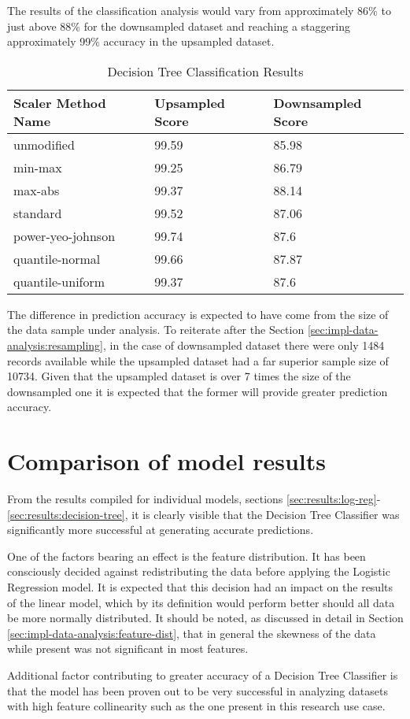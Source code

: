 The results of the classification analysis would vary from approximately 86\% to just above 88\% for the downsampled dataset and reaching a staggering approximately 99\% accuracy in the upsampled dataset.
\begin{table}[h!]
\centering
\caption{Decision Tree Classification Results}
\label{tbl:results:decision-tree}
\begin{tabular}{@{}lll@{}}
\toprule
Scaler Method Name & Upsampled Score & Downsampled Score \\ \midrule
unmodified & 99.59 & 85.98 \\
min-max & 99.25 & 86.79 \\
max-abs & 99.37 & 88.14 \\
standard & 99.52 & 87.06 \\
power-yeo-johnson & 99.74 & 87.6 \\
quantile-normal & 99.66 & 87.87 \\
quantile-uniform & 99.37 & 87.6 \\ \bottomrule
\end{tabular}
\end{table}

The difference in prediction accuracy is expected to have come from the size of the data sample under analysis. To reiterate after the Section \ref{sec:impl-data-analysis:resampling}, in the case of downsampled dataset there were only 1484 records available while the upsampled dataset had a far superior sample size of 10734. Given that the upsampled dataset is over 7 times the size of the downsampled one it is expected that the former will provide greater prediction accuracy.

\section{Comparison of model results}
From the results compiled for individual models, sections \ref{sec:results:log-reg}-\ref{sec:results:decision-tree}, it is clearly visible that the Decision Tree Classifier was significantly more successful at generating accurate predictions. 

One of the factors bearing an effect is the feature distribution. It has been consciously decided against redistributing the data before applying the Logistic Regression model. It is expected that this decision had an impact on the results of the linear model, which by its definition would perform better should all data be more normally distributed. It should be noted, as discussed in detail in Section \ref{sec:impl-data-analysis:feature-dist}, that in general the skewness of the data while present was not significant in most features.

Additional factor contributing to greater accuracy of a Decision Tree Classifier is that the model has been proven out to be very successful in analyzing datasets with high feature collinearity \cite{Bertsimas2017Cart} such as the one present in this research use case. 